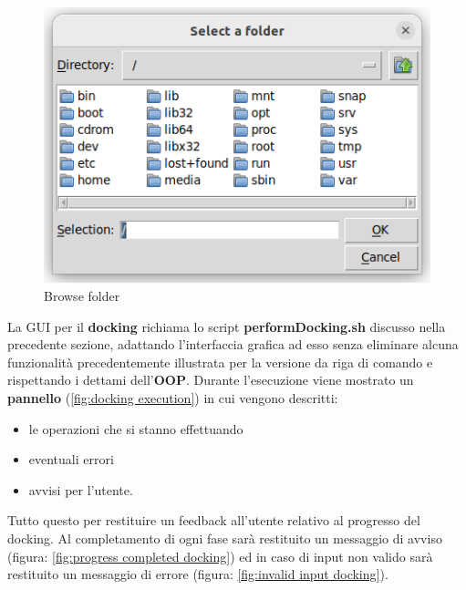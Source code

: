 \begin{figure}[H]
    \centering
    \includegraphics{immagini/capitolo3/browseFoldersDocking.png}
    \caption{Browse folder}
    \label{fig:browse folder docking}
\end{figure}

La GUI per il \textbf{docking} richiama lo script \textbf{performDocking.sh} discusso nella precedente sezione, adattando l'interfaccia grafica ad esso senza eliminare alcuna funzionalità precedentemente illustrata per la versione da riga di comando e rispettando i dettami dell'\textbf{OOP}.\newline
Durante l'esecuzione viene mostrato un \textbf{pannello} (\ref{fig:docking execution}) in cui vengono descritti: 

\begin{itemize}
    \item le operazioni che si stanno effettuando
    \item eventuali errori
    \item avvisi per l'utente.  
\end{itemize}

Tutto questo per restituire un feedback all'utente relativo al progresso del docking. Al completamento di ogni fase sarà restituito un messaggio di avviso (figura: \ref{fig:progress completed docking}) ed in caso di input non valido sarà restituito un messaggio di errore (figura: \ref{fig:invalid input docking}).


